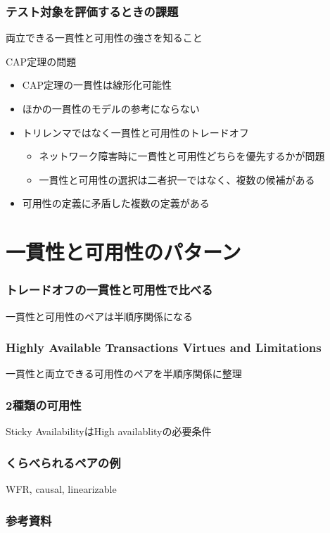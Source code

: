 \documentclass[unicode, 14pt, aspectratio=169]{beamer}
\begin{document}
\begin{frame}
  \frametitle{テスト対象を評価するときの課題}
  {\large 両立できる一貫性と可用性の強さを知ること}
  \par
  \vspace{8pt}
  CAP定理の問題
  \begin{itemize}
  \item CAP定理\cite{cap}の一貫性は線形化可能性\cite{linearizability}
  \item ほかの一貫性のモデルの参考にならない
  \item トリレンマではなく一貫性と可用性のトレードオフ\cite{cap-twelve-years-later}
    \begin{itemize}
    \item ネットワーク障害時に一貫性と可用性どちらを優先するかが問題
    \item 一貫性と可用性の選択は二者択一ではなく、複数の候補がある
    \end{itemize}
  \item 可用性の定義に矛盾した複数の定義がある\cite{kleppmann}    
  \end{itemize}
\end{frame}
\section{一貫性と可用性のパターン}
\begin{frame}[t]
  \frametitle{トレードオフの一貫性と可用性で比べる}
  {\large 一貫性と可用性のペアは半順序関係になる}
\end{frame}
\begin{frame}[t]
  \frametitle{\normalsize{Highly Available Transactions Virtues and Limitations\cite{high}}}
  {\large 一貫性と両立できる可用性のペアを半順序関係に整理}
\end{frame}
\begin{frame}[t]
  \frametitle{2種類の可用性}
  {\large Sticky AvailabilityはHigh availablityの必要条件}
\end{frame}
\begin{frame}[t]
  \frametitle{くらべられるペアの例}
  {\large WFR, causal, linearizable}
\end{frame}
\begin{frame}[allowframebreaks,t]
  \frametitle{参考資料}
  \printbibliography
  \nocite{*}
\end{frame}
\end{document}
